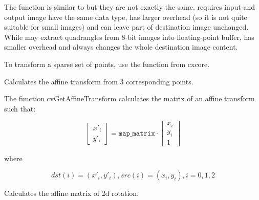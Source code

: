 The function is similar to  but they are not exactly the same.  requires input and output image have the same data type, has larger overhead (so it is not quite suitable for small images) and can leave part of destination image unchanged. While  may extract quadrangles from 8-bit images into floating-point buffer, has smaller overhead and always changes the whole destination image content.

To transform a sparse set of points, use the  function from cxcore.

\label{GetAffineTransform}

Calculates the affine transform from 3 corresponding points.


\begin{description}
\end{description}

The function cvGetAffineTransform calculates the matrix of an affine transform such that:

\[
\begin{bmatrix}
x'_i\\
y'_i
\end{bmatrix}
=
\texttt{map\_matrix}
\cdot
\begin{bmatrix}
x_i\\
y_i\\
1
\end{bmatrix}
\]

where

\[
dst(i)=(x'_i,y'_i),
src(i)=(x_i, y_i),
i=0,1,2
\]

\label{2DRotationMatrix}

Calculates the affine matrix of 2d rotation.


